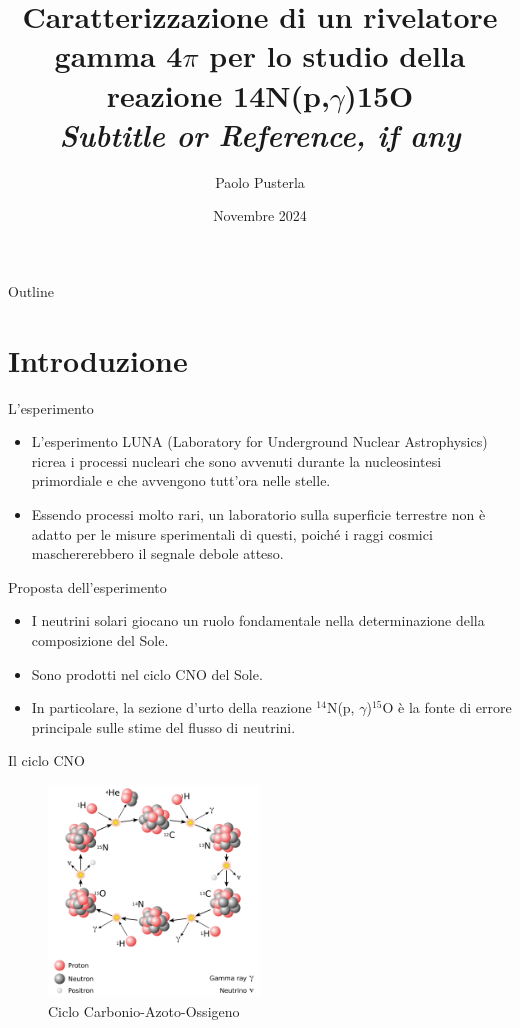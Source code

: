 \documentclass [xcolor=svgnames] {beamer}
\title[Short Title]{Caratterizzazione di un rivelatore gamma 4$\pi$ per lo studio della reazione 14N(p,$\gamma$)15O \\ \textit{Subtitle or Reference, if any}}
\author[P. Pusterla]{Paolo Pusterla}
\institute[UniTo]{Università degli Studi di Torino}
\date{Novembre 2024}
\begin{document}
	
	\begin{frame}
		\titlepage
	\end{frame}
	
	\begin{frame}{Outline}
		\tableofcontents
	\end{frame}
	
	\section{Introduzione}
	\begin{frame}{L'esperimento}
		\begin{itemize}
			\item L'esperimento LUNA (Laboratory for Underground Nuclear Astrophysics) ricrea i processi nucleari che sono avvenuti durante la nucleosintesi primordiale e che avvengono tutt'ora nelle stelle.
			\item Essendo processi molto rari, un laboratorio sulla superficie terrestre non è adatto per le misure sperimentali di questi, poiché i raggi cosmici maschererebbero il segnale debole atteso.
		\end{itemize}
	\end{frame}
	
	
	\begin{frame}{Proposta dell'esperimento}
		\begin{itemize}
			\item I neutrini solari giocano un ruolo fondamentale nella determinazione della composizione del Sole.
			\item Sono prodotti nel ciclo CNO del Sole.
			\item In particolare, la sezione d'urto della reazione $^{14}$N(p, $\gamma$)$^{15}$O è la fonte di errore principale sulle stime del flusso di neutrini.
		\end{itemize}
	\end{frame}
		
	\begin{frame}{Il ciclo CNO}
		\begin{figure}[H]
			\includegraphics[width=0.5\textwidth]{img/CNO_Cycle.pdf}
			\caption{Ciclo Carbonio-Azoto-Ossigeno}
		\end{figure}
	\end{frame}
	
\end{document}
